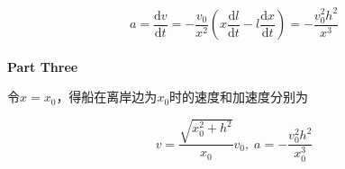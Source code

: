 \documentclass[
	12pt, %
	fleqn, %
	a4paper, %
]{myLegrandOrangeBook}
\newcommand{\rmd}{\mathrm{d}}
\newcommand{\deriv}[2]{\frac{\rmd #1}{\rmd #2}}
\begin{document}
    \[
        a = \deriv{v}{t} = - \frac{v_{0}}{x^{2}} \left(x \deriv{l}{t} - l \deriv{x}{t}\right)
        = -\frac{v_{0}^{2} h^{2}}{x^{3}}
    \]
    \\

    \textbf{Part Three}

    令\(x=x_{0}\)，得船在离岸边为\(x_{0}\)时的速度和加速度分别为

    \[
        v = \frac{\sqrt{x_{0}^{2} + h^2}}{x_{0}} v_{0},\;
        a = -\frac{v_{0}^{2} h^{2}}{x_{0}^{3}}
    \]



\end{document}

